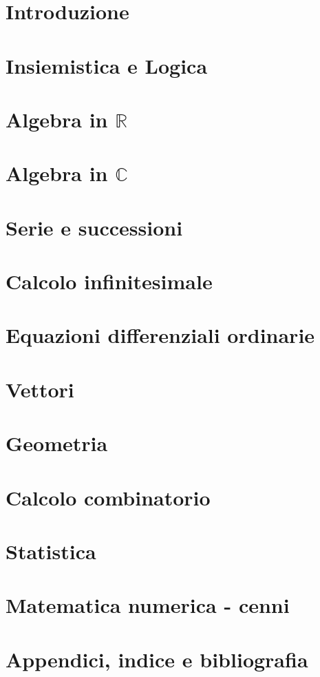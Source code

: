 
\part{Introduzione}\label{book:introduction}


\part{Insiemistica e Logica}\label{book:logics}


\part{Algebra in $\mathbb{R}$}\label{book:algebra}


\part{Algebra in $\mathbb{C}$}\label{book:complex_algebra}


\part{Serie e successioni}\label{book:series}


\part{Calcolo infinitesimale}\label{book:calculus}


\part{Equazioni differenziali ordinarie}\label{book:ode}


\part{Vettori}\label{book:vectors}


\part{Geometria}\label{book:geometry}


\part{Calcolo combinatorio}\label{book:combinatorics}


\part{Statistica}\label{book:statistics}


\part{Matematica numerica - cenni}\label{book:numerical}


\part{Appendici, indice e bibliografia}
